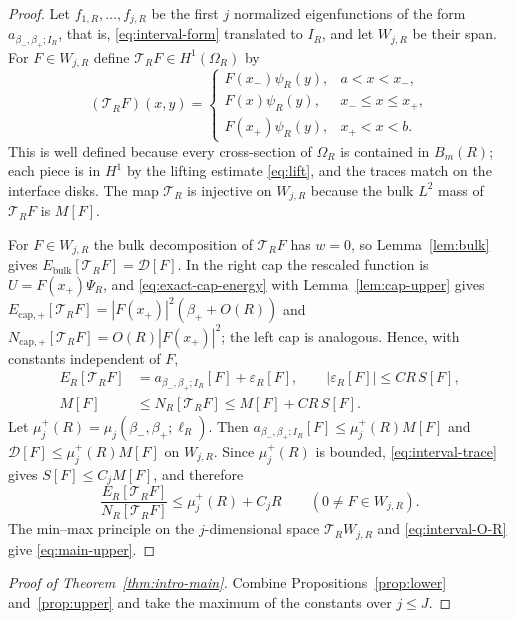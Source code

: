 \documentclass[11pt,a4paper]{article}
\numberwithin{equation}{section}
\theoremstyle{paperplain}
\theoremstyle{remark}
\begin{document}
\begin{proof}
Let $f_{1,R},\ldots,f_{j,R}$ be the first $j$ normalized eigenfunctions of
the form $a_{\beta_-,\beta_+;I_R}$, that is, \eqref{eq:interval-form}
translated to $I_R$, and let $W_{j,R}$ be their span. For $F\in W_{j,R}$
define $\mathcal T_RF\in H^1(\Omega_R)$ by
\[
 (\mathcal T_RF)(x,y)=
 \begin{cases}
 F(x_-)\psi_R(y),&a<x<x_-,\\
 F(x)\psi_R(y),&x_-\le x\le x_+,\\
 F(x_+)\psi_R(y),&x_+<x<b.
 \end{cases}
\]
This is well defined because every cross-section of $\Omega_R$ is contained
in $B_m(R)$; each piece is in $H^1$ by the lifting estimate \eqref{eq:lift},
and the traces match on the interface disks. The map $\mathcal T_R$ is
injective on $W_{j,R}$ because the bulk $L^2$ mass of $\mathcal T_RF$ is
$M[F]$.

For $F\in W_{j,R}$ the bulk decomposition of $\mathcal T_RF$ has $w=0$, so
Lemma~\ref{lem:bulk} gives $E_{\mathrm{bulk}}[\mathcal T_RF]=\mathcal D[F]$.
In the right cap the rescaled function is $U=F(x_+)\Psi_R$, and
\eqref{eq:exact-cap-energy} with Lemma~\ref{lem:cap-upper} gives
$E_{\mathrm{cap},+}[\mathcal T_RF]=|F(x_+)|^2(\beta_++O(R))$ and
$N_{\mathrm{cap},+}[\mathcal T_RF]=O(R)|F(x_+)|^2$; the left cap is
analogous. Hence, with constants independent of $F$,
\begin{align}
 E_R[\mathcal T_RF]&=a_{\beta_-,\beta_+;I_R}[F]+\varepsilon_R[F],\qquad
   |\varepsilon_R[F]|\le CR\,S[F],\label{eq:trial-energy}\\
 M[F]&\le N_R[\mathcal T_RF]\le M[F]+CR\,S[F].\label{eq:trial-mass}
\end{align}
Let $\mu_j^+(R)=\mu_j(\beta_-,\beta_+;\ell_R)$. Then
$a_{\beta_-,\beta_+;I_R}[F]\le\mu_j^+(R)M[F]$ and
$\mathcal D[F]\le\mu_j^+(R)M[F]$ on $W_{j,R}$. Since $\mu_j^+(R)$ is bounded,
\eqref{eq:interval-trace} gives $S[F]\le C_jM[F]$, and therefore
\[
 \frac{E_R[\mathcal T_RF]}{N_R[\mathcal T_RF]}\le\mu_j^+(R)+C_jR
 \qquad(0\ne F\in W_{j,R}).
\]
The min--max principle on the $j$-dimensional space $\mathcal T_RW_{j,R}$
and \eqref{eq:interval-O-R} give \eqref{eq:main-upper}.
\end{proof}

\begin{proof}[Proof of Theorem~\ref{thm:intro-main}]
Combine Propositions~\ref{prop:lower} and~\ref{prop:upper} and take the
maximum of the constants over $j\le J$.
\end{proof}
\end{document}
